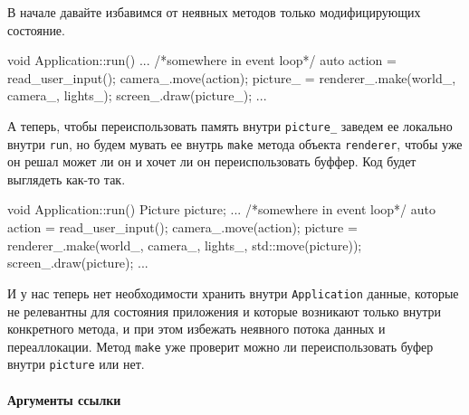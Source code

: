 В начале давайте избавимся от неявных методов только модифицирующих состояние.
\begin{cppcode}
void Application::run() {
  ...
  /*somewhere in event loop*/
  auto action = read_user_input();
  camera_.move(action);
  picture_ = renderer_.make(world_, camera_, lights_);
  screen_.draw(picture_);
  ...
}
\end{cppcode}
А теперь, чтобы переиспользовать память внутри \verb"picture_" заведем ее локально внутри \verb"run", но будем мувать ее внутрь \verb"make" метода объекта \verb"renderer", чтобы уже он решал может ли он и хочет ли он переиспользовать буффер.
Код будет выглядеть как-то так.
\begin{cppcode}
void Application::run() {
  Picture picture;
  ...
  /*somewhere in event loop*/
  auto action = read_user_input();
  camera_.move(action);
  picture = renderer_.make(world_, camera_, lights_, std::move(picture));
  screen_.draw(picture);
  ...
}
\end{cppcode}
И у нас теперь нет необходимости хранить внутри \verb"Application" данные, которые не релевантны для состояния приложения и которые возникают только внутри конкретного метода, и при этом избежать неявного потока данных и переаллокации.
Метод \verb"make" уже проверит можно ли переиспользовать буфер внутри \verb"picture" или нет.

\paragraph{Аргументы ссылки}

